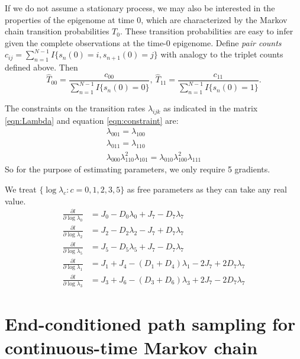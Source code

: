 \documentclass[11pt]{article}
\begin{document}
If we do not assume a stationary process, we may also be interested in
the properties of the epigenome at time 0, which are characterized by
the Markov chain transition
probabilities $T_{0}$. These transition probabilities are easy to
infer given the complete observations at the time-0 epigenome.  Define
{\it pair counts} $c_{ij} = \sum_{n=1}^{N-1}I\{s_n(0) =i,
s_{n+1}(0)=j\}$ with analogy to the triplet counts defined above. Then
\[
\hat{T}_{00} = \frac{c_{00}}{\sum_{n=1}^{N-1}I\{s_n(0) = 0\}}, ~
\hat{T}_{11} = \frac{c_{11}}{\sum_{n=1}^{N-1}I\{s_n(0) = 1\}}.
\]

The constraints on the transition rates $\lambda_{ijk}$ as indicated
in the matrix \eqref{eqn:Lambda} and equation \eqref{eqn:constraint}
are:
\begin{equation}\label{eqn:constraints}
  \begin{array}{c}
    \lambda_{001} = \lambda_{100}\\
    \lambda_{011} = \lambda_{110}\\
    \lambda_{000}\lambda_{110}^2\lambda_{101} = \lambda_{010}\lambda_{100}^2\lambda_{111}
  \end{array}
\end{equation}
So for the purpose of estimating parameters, we only require 5
gradients.

We treat $\{\log\lambda_c: c = 0,1,2,3,5\}$ as free parameters as they
can take any real value.
\begin{equation}
  \begin{aligned}
    \frac{\partial l}{\partial \log\lambda_0} &= J_0 - D_0\lambda_0 + J_7 - D_7\lambda_7\\
    \frac{\partial l}{\partial \log\lambda_2} &= J_2 - D_2\lambda_2 - J_7 + D_7\lambda_7 \\
    \frac{\partial l}{\partial \log\lambda_5} &= J_5 - D_5\lambda_5 + J_7 - D_7\lambda_7\\
    \frac{\partial l}{\partial \log\lambda_1} &= J_1 + J_4 - (D_1 + D_4)\lambda_1 - 2J_7 + 2D_7\lambda_7\\
    \frac{\partial l}{\partial \log\lambda_3} &= J_3 + J_6 - (D_3 + D_6)\lambda_3 + 2J_7 - 2D_7\lambda_7
  \end{aligned}
\end{equation}


\section{End-conditioned path sampling for continuous-time Markov chain}
\end{document}
